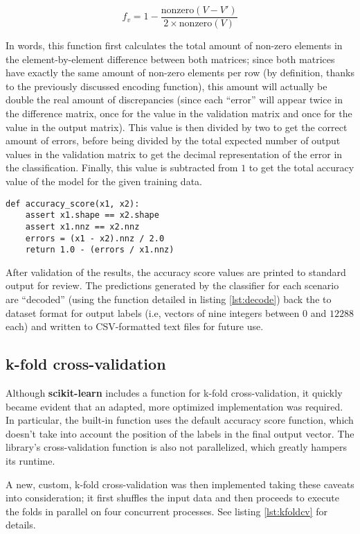 \documentclass{kthreport}
\theoremstyle{definition}
\begin{document}
\[ f_{v} = 1 - \frac{\text{nonzero}(V - V')}{2 \times \text{nonzero}(V)} \]

In words, this function first calculates the total amount of non-zero elements in the element-by-element difference between both matrices; since both matrices have exactly the same amount of non-zero elements per row (by definition, thanks to the previously discussed encoding function), this amount will actually be double the real amount of discrepancies (since each ``error'' will appear twice in the difference matrix, once for the value in the validation matrix and once for the value in the output matrix).
This value is then divided by two to get the correct amount of errors, before being divided by the total expected number of output values in the validation matrix to get the decimal representation of the error in the classification.
Finally, this value is subtracted from $1$ to get the total accuracy value of the model for the given training data. 

\begin{lstlisting}[style=MyPython, caption={Accuracy score function implemented in Python}]
def accuracy_score(x1, x2):
	assert x1.shape == x2.shape
	assert x1.nnz == x2.nnz
	errors = (x1 - x2).nnz / 2.0
	return 1.0 - (errors / x1.nnz)
\end{lstlisting}

After validation of the results, the accuracy score values are printed to standard output for review. 
The predictions generated by the classifier for each scenario are ``decoded'' (using the function detailed in listing \ref{lst:decode}) back the to dataset format for output labels (i.e, vectors of nine integers between $0$ and $12 288$ each) and written to CSV-formatted text files for future use.

\subsection{k-fold cross-validation}

Although \textbf{scikit-learn} includes a function for k-fold cross-validation, it quickly became evident that an adapted, more optimized implementation was required. 
In particular, the built-in function uses the default accuracy score function, which doesn't take into account the position of the labels in the final output vector. The library's cross-validation function is also not parallelized, which greatly hampers its runtime.

A new, custom, k-fold cross-validation was then implemented taking these caveats into consideration; it first shuffles the input data and then proceeds to execute the folds in parallel on four concurrent processes. See listing \ref{lst:kfoldcv} for details.
\end{document}
